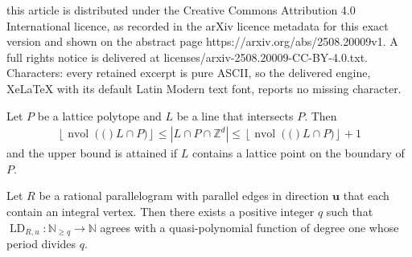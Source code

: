 \documentclass[10pt,a4paper]{amsart}
\DeclareMathOperator{\LD}{LD}
\newcommand{\N}{\mathbb{N}}
\newcommand{\Z}{\mathbb{Z}}
\newcommand{\bu}{\mathbf{u}}
\newcommand{\nvol}[1]{\operatorname{nvol}\left(#1\right)}
\begin{document}
this article is distributed under the Creative Commons Attribution 4.0 International licence, as recorded in the arXiv licence metadata for this exact version and shown on the abstract page https://arxiv.org/abs/2508.20009v1. A full rights notice is delivered at licenses/arxiv-2508.20009-CC-BY-4.0.txt. Characters: every retained excerpt is pure ASCII, so the delivered engine, XeLaTeX with its default Latin Modern text font, reports no missing character.
\begin{lemma}\label{lem:nvol}
    Let $P$ be a lattice polytope and $L$ be a line that intersects $P$. Then
    \begin{align*}
    \left \lfloor \nvol(L \cap P) \right \rfloor \leq |L \cap P \cap \Z^d| \leq  \left \lfloor \nvol(L \cap P) \right \rfloor + 1
    \end{align*}
and the upper bound is attained if $L$ contains a lattice point on the boundary of $P$.
\end{lemma}

\begin{proposition}\label{prop:QP-in-parallelotope}
    Let $R$ be a rational parallelogram with parallel edges in direction $\bu$ that each contain an integral vertex. Then there exists a positive integer $q$ such that \mbox{$\LD_{R,u}:\N_{\geq q} \to \N$} agrees with a quasi-polynomial function of degree one whose period divides $q$.
\end{proposition}
\end{document}
